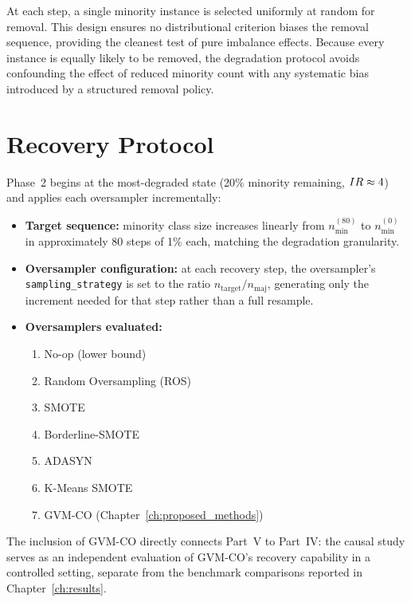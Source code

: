 At each step, a single minority instance is selected uniformly at random for removal.
This design ensures no distributional criterion biases the removal sequence, providing the cleanest test of pure imbalance effects.
Because every instance is equally likely to be removed, the degradation protocol avoids confounding the effect of reduced minority count with any systematic bias introduced by a structured removal policy.


\section{Recovery Protocol}
\label{sec:setup_causal:recovery}

Phase~2 begins at the most-degraded state (20\% minority remaining, $IR \approx 4$) and applies each oversampler incrementally:

\begin{itemize}[leftmargin=*]
    \item \textbf{Target sequence:} minority class size increases linearly from $n_{\min}^{(80)}$ to $n_{\min}^{(0)}$ in approximately 80 steps of 1\% each, matching the degradation granularity.
    \item \textbf{Oversampler configuration:} at each recovery step, the oversampler's \texttt{sampling\_strategy} is set to the ratio $n_{\text{target}} / n_{\text{maj}}$, generating only the increment needed for that step rather than a full resample.
    \item \textbf{Oversamplers evaluated:}
    \begin{enumerate}[leftmargin=*]
        \item No-op (lower bound)
        \item Random Oversampling (ROS)~\cite{fernandez2018learning}
        \item SMOTE~\cite{chawla2002smote}
        \item Borderline-SMOTE~\cite{han2005borderline}
        \item ADASYN~\cite{he2008adasyn}
        \item K-Means SMOTE~\cite{douzas2018improving}
        \item GVM-CO (Chapter~\ref{ch:proposed_methods})
    \end{enumerate}
\end{itemize}

The inclusion of GVM-CO directly connects Part~V to Part~IV: the causal study serves as an independent evaluation of GVM-CO's recovery capability in a controlled setting, separate from the benchmark comparisons reported in Chapter~\ref{ch:results}.


